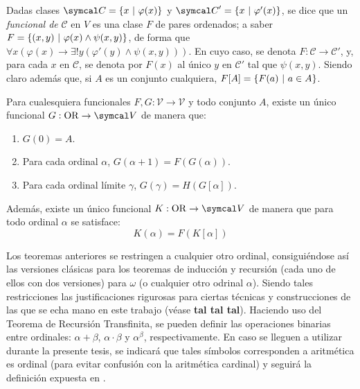 Dadas clases $\mathcal{C}=\{x \tq \varphi(x)\}$ y $\mathcal{C}'=\{x \tq \varphi'(x)\}$, se dice que un \textit{funcional de} $\mathcal{C}$ en $V$ es una clase $F$ de pares ordenados; a saber $F=\{(x,y) \text{ $|$ } \varphi(x) \land \psi(x,y)\}$, de forma que $\forall x (\varphi(x)\to \exists! y (\varphi'(y) \land \psi(x,y))) $. En cuyo caso, se denota $F:\mathcal{C} \to \mathcal{C}'$, y, para cada $x$ en $\mathcal{C}$, se denota por $F(x)$ al único $y$ en $\mathcal{C}'$ tal que $\psi(x,y)$. Siendo claro además que, si $A$ es un conjunto cualquiera, $F[A]=\{F(a) \text{ $|$ } a \in A\}$.

\begin{teorema}
	Para cualesquiera funcionales $F,G:\mathcal{V} \to \mathcal{V}$ y todo conjunto $A$, existe un único funcional $G:\OR \to \mathcal{V}$ de manera que:
	\begin{enumerate}
		\item $G(0)=A$.
		\item Para cada ordinal $\alpha$, $G(\alpha+1)=F(G(\alpha))$.
		\item Para cada ordinal límite $\gamma$, $G(\gamma)=H(G[\alpha])$.
	\end{enumerate}

	Además, existe un único funcional $K:\OR \to \mathcal{V}$ de manera que para todo ordinal $\alpha$ se satisface:
	\[ K(\alpha)=F(K[\alpha]) \]
\end{teorema}

Los teoremas anteriores se restringen a cualquier otro ordinal, consiguiéndose así las versiones clásicas para los teoremas de inducción y recursión (cada uno de ellos con dos versiones) para $\omega$ (o cualquier otro odrinal $\alpha$). Siendo tales restricciones las justificaciones rigurosas para ciertas técnicas y construcciones de las que se echa mano en este trabajo (véase \textbf{tal tal tal}).
\index[sym]{$\alpha + \beta$}\index[sym]{$\alpha \cdot \beta$}\index[sym]{$\alpha ^ \beta$}
Haciendo uso del Teorema de Recursión Transfinita, se pueden definir las operaciones binarias entre ordinales: $\alpha + \beta$, $\alpha \cdot \beta$ y $\alpha ^ \beta$, respectivamente. En caso se lleguen a utilizar durante la presente tesis, se indicará que tales símbolos corresponden a aritmética es ordinal (para evitar confusión con la aritmética cardinal) y seguirá la definición expuesta en \cite[p.XXX]{amorIntermedio}.

